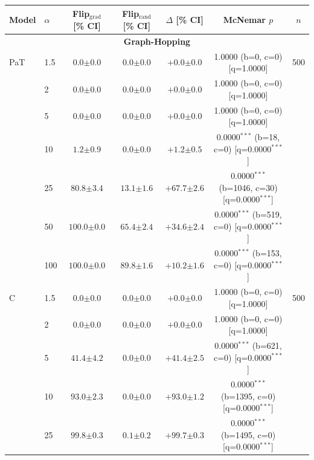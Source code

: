 \begin{table}[h!]
\centering
\tiny
\setlength{\tabcolsep}{4pt}
\begin{tabular}{l l cccc c}
\toprule
Model & $\alpha$ & Flip$_{\text{grad}}$ [\% CI] & Flip$_{\text{rand}}$ [\% CI] & $\Delta$ [\% CI] & McNemar $p$ & $n$ \\
\midrule
\multicolumn{7}{c}{\textbf{Graph-Hopping}} \\
\midrule
PaT & 1.5 & $0.0 {\scriptstyle \pm 0.0}$ & $0.0 {\scriptstyle \pm 0.0}$ & $+0.0 {\scriptstyle \pm 0.0}$ & 1.0000 (b=0, c=0) [q=1.0000] & 500 \\
 & 2 & $0.0 {\scriptstyle \pm 0.0}$ & $0.0 {\scriptstyle \pm 0.0}$ & $+0.0 {\scriptstyle \pm 0.0}$ & 1.0000 (b=0, c=0) [q=1.0000] &  \\
 & 5 & $0.0 {\scriptstyle \pm 0.0}$ & $0.0 {\scriptstyle \pm 0.0}$ & $+0.0 {\scriptstyle \pm 0.0}$ & 1.0000 (b=0, c=0) [q=1.0000] &  \\
 & 10 & $1.2 {\scriptstyle \pm 0.9}$ & $0.0 {\scriptstyle \pm 0.0}$ & $+1.2 {\scriptstyle \pm 0.5}$ & 0.0000$^{***}$ (b=18, c=0) [q=0.0000$^{***}$] &  \\
 & 25 & $80.8 {\scriptstyle \pm 3.4}$ & $13.1 {\scriptstyle \pm 1.6}$ & $+67.7 {\scriptstyle \pm 2.6}$ & 0.0000$^{***}$ (b=1046, c=30) [q=0.0000$^{***}$] &  \\
 & 50 & $100.0 {\scriptstyle \pm 0.0}$ & $65.4 {\scriptstyle \pm 2.4}$ & $+34.6 {\scriptstyle \pm 2.4}$ & 0.0000$^{***}$ (b=519, c=0) [q=0.0000$^{***}$] &  \\
 & 100 & $100.0 {\scriptstyle \pm 0.0}$ & $89.8 {\scriptstyle \pm 1.6}$ & $+10.2 {\scriptstyle \pm 1.6}$ & 0.0000$^{***}$ (b=153, c=0) [q=0.0000$^{***}$] &  \\
\midrule
C & 1.5 & $0.0 {\scriptstyle \pm 0.0}$ & $0.0 {\scriptstyle \pm 0.0}$ & $+0.0 {\scriptstyle \pm 0.0}$ & 1.0000 (b=0, c=0) [q=1.0000] & 500 \\
 & 2 & $0.0 {\scriptstyle \pm 0.0}$ & $0.0 {\scriptstyle \pm 0.0}$ & $+0.0 {\scriptstyle \pm 0.0}$ & 1.0000 (b=0, c=0) [q=1.0000] &  \\
 & 5 & $41.4 {\scriptstyle \pm 4.2}$ & $0.0 {\scriptstyle \pm 0.0}$ & $+41.4 {\scriptstyle \pm 2.5}$ & 0.0000$^{***}$ (b=621, c=0) [q=0.0000$^{***}$] &  \\
 & 10 & $93.0 {\scriptstyle \pm 2.3}$ & $0.0 {\scriptstyle \pm 0.0}$ & $+93.0 {\scriptstyle \pm 1.2}$ & 0.0000$^{***}$ (b=1395, c=0) [q=0.0000$^{***}$] &  \\
 & 25 & $99.8 {\scriptstyle \pm 0.3}$ & $0.1 {\scriptstyle \pm 0.2}$ & $+99.7 {\scriptstyle \pm 0.3}$ & 0.0000$^{***}$ (b=1495, c=0) [q=0.0000$^{***}$] &  \\

\end{tabular}
\end{table}
